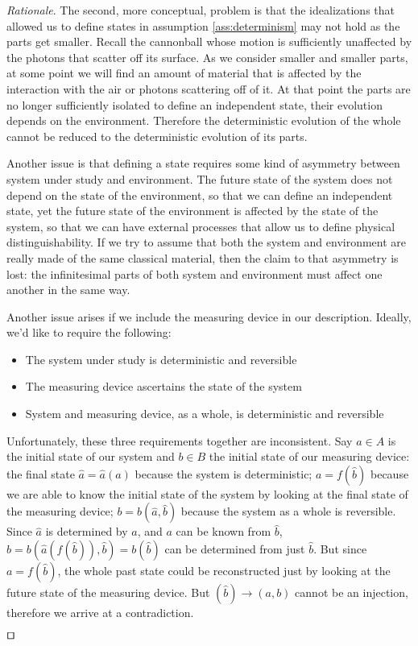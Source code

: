 \documentclass[smallextended]{svjour3}
\numberwithin{equation}{section}
\newenvironment{rationale}{\emph{Rationale}.}{\hfill\(\qed\)}
\begin{document}
\begin{rationale}
	The second, more conceptual, problem is that the idealizations that allowed us to define states in assumption \ref{ass:determinism} may not hold as the parts get smaller. Recall the cannonball whose motion is sufficiently unaffected by the photons that scatter off its surface. As we consider smaller and smaller parts, at some point we will find an amount of material that is affected by the interaction with the air or photons scattering off of it. At that point the parts are no longer sufficiently isolated to define an independent state, their evolution depends on the environment. Therefore the deterministic evolution of the whole cannot be reduced to the deterministic evolution of its parts.
	
	Another issue is that defining a state requires some kind of asymmetry between system under study and environment. The future state of the system does not depend on the state of the environment, so that we can define an independent state, yet the future state of the environment is affected by the state of the system, so that we can have external processes that allow us to define physical distinguishability. If we try to assume that both the system and environment are really made of the same classical material, then the claim to that asymmetry is lost: the infinitesimal parts of both system and environment must affect one another in the same way.
	
	Another issue arises if we include the measuring device in our description. Ideally, we'd like to require the following:
	\begin{itemize}[noitemsep]
		\item The system under study is deterministic and reversible
		\item The measuring device ascertains the state of the system
		\item System and measuring device, as a whole, is deterministic and reversible
	\end{itemize}
	Unfortunately, these three requirements together are inconsistent. Say $a \in A$ is the initial state of our system and $b \in B$ the initial state of our measuring device: the final state $\hat{a}=\hat{a}(a)$ because the system is deterministic; $a=f(\hat{b})$ because we are able to know the initial state of the system by looking at the final state of the measuring device; $b=b(\hat{a},\hat{b})$ because the system as a whole is reversible. Since $\hat{a}$ is determined by $a$, and $a$ can be known from $\hat{b}$, $b = b(\hat{a}(f(\hat{b})), \hat{b}) = b(\hat{b})$ can be determined from just $\hat{b}$. But since $a=f(\hat{b})$, the whole past state could be reconstructed just by looking at the future state of the measuring device. But $(\hat{b}) \rightarrow (a, b)$ cannot be an injection, therefore we arrive at a contradiction.
	

\end{rationale}
\end{document}
